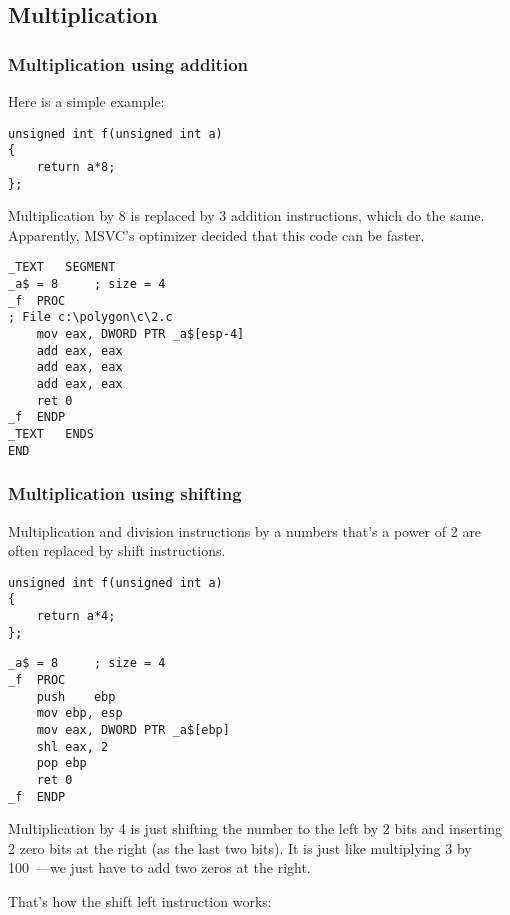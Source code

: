 ﻿\subsection{Multiplication}

\subsubsection{Multiplication using addition}

Here is a simple example:

\begin{lstlisting}[style=customc]
unsigned int f(unsigned int a)
{
	return a*8;
};
\end{lstlisting}

Multiplication by 8 is replaced by 3 addition instructions, which do the same.
Apparently, MSVC's optimizer decided that this code can be faster.

\begin{lstlisting}[caption=\Optimizing MSVC 2010,style=customasmx86]
_TEXT	SEGMENT
_a$ = 8		; size = 4
_f	PROC
; File c:\polygon\c\2.c
	mov	eax, DWORD PTR _a$[esp-4]
	add	eax, eax
	add	eax, eax
	add	eax, eax
	ret	0
_f	ENDP
_TEXT	ENDS
END
\end{lstlisting}

\subsubsection{Multiplication using shifting}
\label{subsec:mult_using_shifts}

Multiplication and division instructions by a numbers that's a power of 2 are often replaced by shift instructions.

\begin{lstlisting}[style=customc]
unsigned int f(unsigned int a)
{
	return a*4;
};
\end{lstlisting}

\begin{lstlisting}[caption=\NonOptimizing MSVC 2010,style=customasmx86]
_a$ = 8		; size = 4
_f	PROC
	push	ebp
	mov	ebp, esp
	mov	eax, DWORD PTR _a$[ebp]
	shl	eax, 2
	pop	ebp
	ret	0
_f	ENDP
\end{lstlisting}


Multiplication by 4 is just shifting the number to the left by 2 bits
and inserting 2 zero bits at the right (as the last two bits).
It is just like multiplying 3 by 100~---we just have to add two zeros at the right.

That's how the shift left instruction works:

